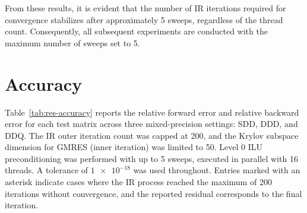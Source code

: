From these results, it is evident that the number of IR iterations required for
convergence stabilizes after approximately 5 sweeps, regardless of the thread
count. Consequently, all subsequent experiments are conducted with the maximum
number of sweeps set to 5.

\section{Accuracy}
\label{sec:accuracy}

Table~\ref{tab:res-accuracy} reports the relative forward error and relative
backward error for each test matrix across three mixed-precision settings: SDD,
DDD, and DDQ. The IR outer iteration count was capped at 200, and the Krylov
subspace dimension for GMRES (inner iteration) was limited to 50. Level 0 ILU
preconditioning was performed with up to 5 sweeps, executed in parallel with 16
threads. A tolerance of \(\num{1e-18}\) was used throughout. Entries marked with
an asterisk indicate cases where the IR process reached the maximum of 200
iterations without convergence, and the reported residual corresponds to the
final iteration.

